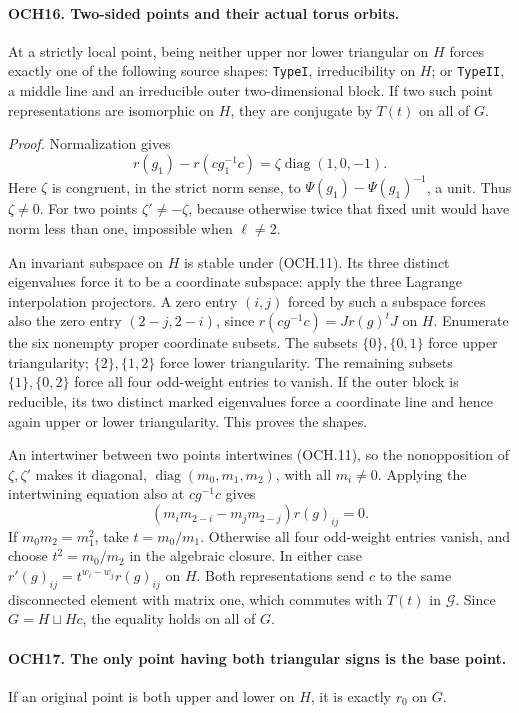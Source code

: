 \paragraph{OCH16. Two-sided points and their actual torus orbits.}
\label{claim:OCH16}
At a strictly local point, being neither upper nor lower triangular
on \(H\) forces exactly one of the following source shapes:
\texttt{TypeI}, irreducibility on \(H\); or \texttt{TypeII},
a middle line and an irreducible outer two-dimensional block.
If two such point representations are isomorphic on \(H\),
they are conjugate by \(T(t)\) on all of \(G\).

\emph{Proof.}
Normalization gives
\[
 r(g_1)-r(cg_1^{-1}c)=\zeta\operatorname{diag}(1,0,-1).
 \tag{OCH.11}
\]
Here \(\zeta\) is congruent, in the strict norm sense, to
\(\Psi(g_1)-\Psi(g_1)^{-1}\), a unit.  Thus \(\zeta\ne0\).
For two points \(\zeta'\ne-\zeta\), because otherwise twice
that fixed unit would have norm less than one, impossible when
\(\ell\ne2\).

An invariant subspace on \(H\) is stable under (OCH.11).
Its three distinct eigenvalues force it to be a coordinate subspace:
apply the three Lagrange interpolation projectors.  A zero entry
\((i,j)\) forced by such a subspace forces also the zero entry
\((2-j,2-i)\), since
\(r(cg^{-1}c)=Jr(g)^tJ\) on \(H\).
Enumerate the six nonempty proper coordinate subsets.
The subsets \(\{0\},\{0,1\}\) force upper triangularity;
\(\{2\},\{1,2\}\) force lower triangularity.
The remaining subsets \(\{1\},\{0,2\}\) force all four
odd-weight entries to vanish.  If the outer block is reducible,
its two distinct marked eigenvalues force a coordinate line and
hence again upper or lower triangularity.  This proves the shapes.

An intertwiner between two points intertwines (OCH.11), so the
nonopposition of \(\zeta,\zeta'\) makes it diagonal,
\(\operatorname{diag}(m_0,m_1,m_2)\), with all \(m_i\ne0\).
Applying the intertwining equation also at \(cg^{-1}c\) gives
\[
 (m_im_{2-i}-m_jm_{2-j})r(g)_{ij}=0.
\]
If \(m_0m_2=m_1^2\), take \(t=m_0/m_1\).
Otherwise all four odd-weight entries vanish, and choose
\(t^2=m_0/m_2\) in the algebraic closure.  In either case
\(r'(g)_{ij}=t^{w_i-w_j}r(g)_{ij}\) on \(H\).
Both representations send \(c\) to the same disconnected element
with matrix one, which commutes with \(T(t)\) in \(\mathcal G\).
Since \(G=H\sqcup Hc\), the equality holds on all of \(G\).

\paragraph{OCH17. The only point having both triangular signs is the base point.}
\label{claim:OCH17}
If an original point is both upper and lower on \(H\), it is
exactly \(r_0\) on \(G\).

